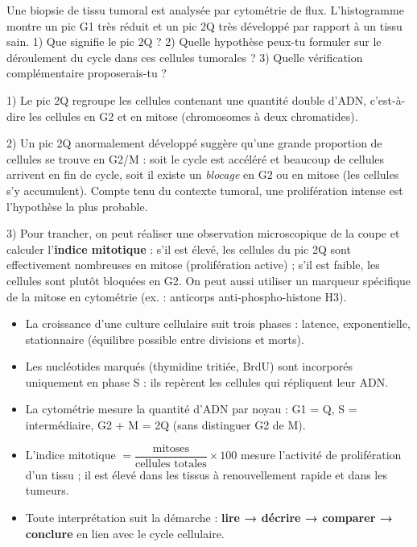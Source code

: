 \documentclass[11pt]{article}
\newcommand{\cle}[1]{{\popxbold\color{popdark}#1}}
\begin{document}
\begin{exercice}
Une biopsie de tissu tumoral est analysée par cytométrie de flux. L'histogramme montre un pic G1 très réduit et un pic 2Q très développé par rapport à un tissu sain. 1) Que signifie le pic 2Q ? 2) Quelle hypothèse peux-tu formuler sur le déroulement du cycle dans ces cellules tumorales ? 3) Quelle vérification complémentaire proposerais-tu ?
\end{exercice}

\begin{corrige}[Exercice 1]
1) Le pic 2Q regroupe les cellules contenant une quantité double d'ADN, c'est-à-dire les cellules en G2 et en mitose (chromosomes à deux chromatides).

2) Un pic 2Q anormalement développé suggère qu'une grande proportion de cellules se trouve en G2/M : soit le cycle est accéléré et beaucoup de cellules arrivent en fin de cycle, soit il existe un \emph{blocage} en G2 ou en mitose (les cellules s'y accumulent). Compte tenu du contexte tumoral, une prolifération intense est l'hypothèse la plus probable.

3) Pour trancher, on peut réaliser une observation microscopique de la coupe et calculer l'\textbf{indice mitotique} : s'il est élevé, les cellules du pic 2Q sont effectivement nombreuses en mitose (prolifération active) ; s'il est faible, les cellules sont plutôt bloquées en G2. On peut aussi utiliser un marqueur spécifique de la mitose en cytométrie (ex. : anticorps anti-phospho-histone H3).
\end{corrige}

\begin{aretenir}
\begin{itemize}
\item La croissance d'une culture cellulaire suit trois phases : \cle{latence}, \cle{exponentielle}, \cle{stationnaire} (équilibre possible entre divisions et morts).
\item Les nucléotides marqués (thymidine tritiée, BrdU) sont incorporés uniquement en \cle{phase S} : ils repèrent les cellules qui répliquent leur ADN.
\item La \cle{cytométrie} mesure la quantité d'ADN par noyau : G1 = Q, S = intermédiaire, G2 + M = 2Q (sans distinguer G2 de M).
\item L'\cle{indice mitotique} $= \dfrac{\text{mitoses}}{\text{cellules totales}} \times 100$ mesure l'activité de prolifération d'un tissu ; il est élevé dans les tissus à renouvellement rapide et dans les tumeurs.
\item Toute interprétation suit la démarche : \textbf{lire → décrire → comparer → conclure} en lien avec le cycle cellulaire.
\end{itemize}
\end{aretenir}
\end{document}
